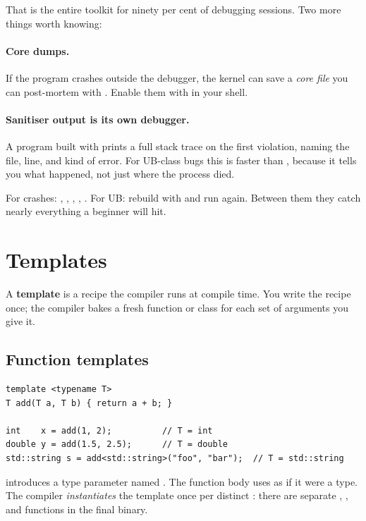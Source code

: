 That is the entire toolkit for ninety per cent of debugging
sessions. Two more things worth knowing:

\paragraph{Core dumps.}
If the program crashes outside the debugger, the kernel can save a
\emph{core file} you can post-mortem with .
Enable them with  in your shell.

\paragraph{Sanitiser output is its own debugger.}
A program built with  prints a
full stack trace on the first violation, naming the file, line,
and kind of error. For UB-class bugs this is faster than
, because it tells you what happened, not just where the
process died.

\begin{idea}
For crashes: , , , ,
. For UB: rebuild with
 and run again. Between them they
catch nearly everything a beginner will hit.
\end{idea}

\section{Templates}
\label{sec:cpp:templates}

A \textbf{template} is a recipe the compiler runs at compile time.
You write the recipe once; the compiler bakes a fresh function or
class for each set of arguments you give it.

\subsection{Function templates}

\begin{lstlisting}
template <typename T>
T add(T a, T b) { return a + b; }

int    x = add(1, 2);          // T = int
double y = add(1.5, 2.5);      // T = double
std::string s = add<std::string>("foo", "bar");  // T = std::string
\end{lstlisting}

 introduces a type parameter named . The
function body uses  as if it were a type. The compiler
\emph{instantiates} the template once per distinct : there
are separate , , and
 functions in the final binary.

